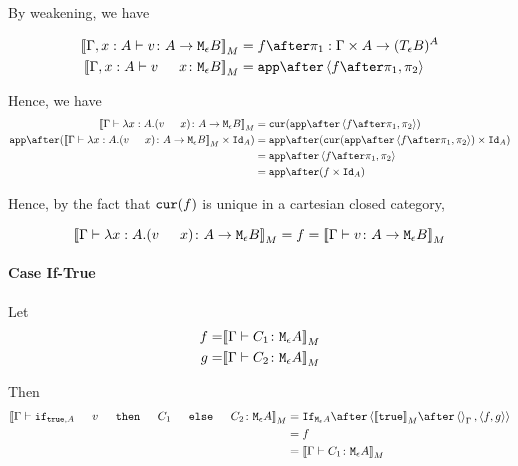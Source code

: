 {    By weakening, we have

    \begin{align}
        \deno{\typerelation{\gax}{v}{\aeb}} & = f \after \p : \G \times A \rightarrow (\teb)^A \\
        \deno{\typerelation{\gax}{\apply{v}{x}}{\meb}} & = \app\after\pr{f \after \p}{\pp} \\
    \end{align}

    Hence, we have 
    \begin{equation}
        \begin{split}
            \deno{\gtyperelation{\lam{x}{A}{(\apply{v}{x})}}{\aeb}} & = \cur{\app\after\pr{f \after \p}{\pp}}\\
            \app\after(\deno{\gtyperelation{\lam{x}{A}{(\apply{v}{x})}}{\aeb}} \times \Id{A}) & = \app \after(\cur{\app\after\pr{f \after \p}{\pp}}\times \Id{A})\\
            & = \app \after\pr{f\after\p}{\pp}\\
            & = \app\after(f\times\Id{A})
        \end{split}
    \end{equation}

    Hence, by the fact that $\texttt{cur}(f)$ is unique in a cartesian closed category, 

    \begin{equation}
        \deno{\gtyperelation{\lam{x}{A}{(\apply{v}{x})}}{\aeb}} = f =\deno{\gtyperelation{v}{\aeb}}
    \end{equation}

    \paragraph{Case If-True}
    Let
    \begin{align}
        f = &{\bf [\![}\Gamma \vdash C_1 \colon \texttt{M}_{\epsilon}{A}{\bf ]\!]}_M\\
        g = &{\bf [\![}\Gamma \vdash C_2 \colon \texttt{M}_{\epsilon}{A}{\bf ]\!]}_M\\
    \end{align}

    Then
    \begin{equation}
        \begin{split}
            \deno{\gtyperelation{\ifthenelse{\t}{A}{v}{C_1}{C_2}}{\mea}} & = \ifnt{\mea}\after \pr{\deno{\t}\after\term{\G}}{\pr{f}{g}} \\
            & = f\\
            & = \deno{\gtyperelation{C_1}{\mea}}\\
        \end{split}
    \end{equation}

}
